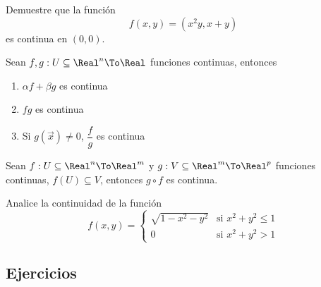 \begin{frame}
  \begin{eg}
    Demuestre que la función
    $$f(x,y)=(x^2y,x+y)$$
    es continua en $(0,0)$.
  \end{eg}
\end{frame}

\begin{frame}
  \begin{propo}
    Sean $f,g:U\subseteq\Real^n\To\Real$ funciones continuas, entonces
    \begin{enumerate}[<+->]
      \item $\alpha f+\beta g$ es continua
      \item $fg$ es continua
      \item Si $g(\vec{x})\neq0$, $\dfrac{f}{g}$ es continua
    \end{enumerate}
  \end{propo}
\end{frame}

\begin{frame}
  \begin{thm}
    Sean $f:U\subseteq\Real^n\To\Real^m$ y $g:V\subseteq\Real^m\To\Real^p$ funciones continuas, $f(U)\subseteq V$, entonces $g\circ f$ es continua.
  \end{thm}
\end{frame}

\begin{frame}
  \begin{eg}
    Analice la continuidad de la función
    $$f(x,y)=\left\{\begin{array}{ll}
      \sqrt{1-x^2-y^2} & \text{si } x^2+y^2\leq 1\\
      0 & \text{si } x^2+y^2>1
    \end{array}\right.$$
  \end{eg}
\end{frame}

\subsection{Ejercicios}
\begin{frame}
\subsectionpage
\end{frame}


